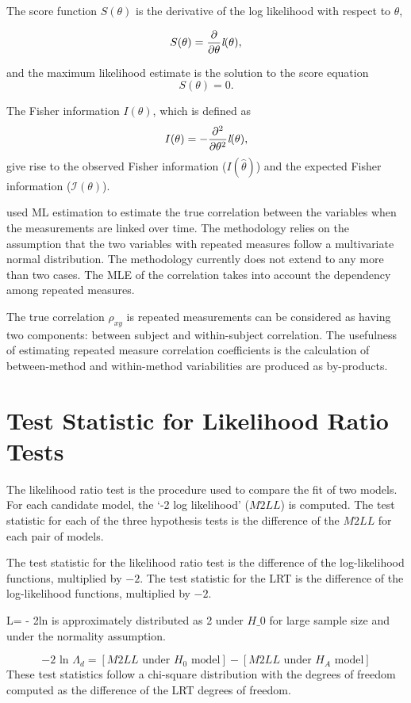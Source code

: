 \documentclass[12pt, a4paper]{report}
\theoremstyle{plain}
\theoremstyle{definition}
\theoremstyle{remark}
\begin{document}
The score function $S(\theta)$ is the derivative of the log likelihood with respect to $\theta$,

\[
S(\theta) = \frac{\partial}{\partial \theta}\emph{l}(\theta),
\]

and the maximum likelihood estimate is the solution to the score equation
\[
S(\theta) = 0.
\]


The Fisher information $I(\theta)$, which is defined as
\[
I(\theta) = - \frac{\partial^2}{\partial \theta^2}\emph{l}(\theta),
\]
give rise to the observed Fisher information ($I(\hat{\theta})$) and the expected Fisher information ($\mathcal{I}(\theta)$).




\citet{Lam} used ML estimation to estimate the true correlation between the variables when
the measurements are linked over time. The methodology relies on the assumption that the two variables with repeated measures follow a multivariate normal distribution. The methodology currently does not extend to any more than two cases. The MLE of the correlation takes into account the dependency among repeated measures.

The true correlation $\rho_{xy}$ is repeated measurements can be considered as having two components: between subject and within-subject correlation. The usefulness of estimating repeated measure correlation coefficients is the calculation of between-method and within-method variabilities are produced as by-products.

\section{Test Statistic for Likelihood Ratio Tests}
The likelihood ratio test is the procedure used to compare the fit of two models. For each candidate model, the `-2 log likelihood' ($M2LL$) is computed. The test statistic for each of the three hypothesis tests is the difference of the $M2LL$ for each pair of models. 

The test statistic for the likelihood ratio test is the difference of the log-likelihood functions, multiplied by $-2$. 
The test statistic for the LRT is the difference of the log-likelihood functions, multiplied by $-2$.

L= - 2ln is approximately distributed as 2 under $H\_0$ for large sample size and under the normality assumption.

\begin{equation}
-2\mbox{ ln }\Lambda_{d} =  [ M2LL \mbox{ under }H_{0} \mbox{ model}] - [ M2LL \mbox{ under }H_{A} \mbox{ model}]
\end{equation}
These test statistics follow a chi-square distribution with the degrees of freedom computed as the difference of the LRT degrees of freedom.
\end{document}
